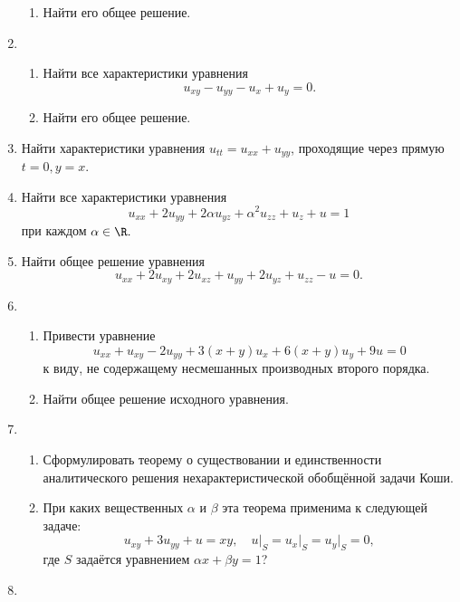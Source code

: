 \documentclass[a4paper]{article}
\def\a{\alpha}
\def\b{\beta}
\begin{document}
\begin{enumerate}
\begin{enumerate}
  \item
  Найти его общее решение.

\end{enumerate}

\item
\begin{enumerate}

  \item
  Найти все характеристики уравнения
  $$u_{xy}-u_{yy}-u_{x}+u_y =0.$$

  \item
  Найти его общее решение.

\end{enumerate}

\item
Найти характеристики уравнения $u_{tt}=u_{xx}+u_{yy}$, проходящие через
прямую $t=0, y=x$.

\item
Найти все характеристики уравнения
$$u_{xx}+2u_{yy}+2\a u_{yz}+\a^2 u_{zz} +u_z+ u=1$$
при каждом $\a\in\R.$

\item
Найти общее решение уравнения
$$u_{xx}+2u_{xy}+2 u_{xz}+u_{yy} +2u_{yz} +u_{zz} - u=0.$$

\item
\begin{enumerate}

\item
Привести уравнение
$$u_{xx}+u_{xy}-2u_{yy}+3(x+y)u_x+6(x+y)u_y+9u=0$$
к виду, не содержащему несмешанных производных второго порядка.

\item
Найти общее решение исходного уравнения.
\end{enumerate}

\item
\begin{enumerate}

\item
Сформулировать теорему о существовании и един\-ствен\-нос\-ти аналитического
решения не\-ха\-рак\-те\-рис\-ти\-чес\-кой об\-об\-щ\"ен\-ной за\-да\-чи Коши.

\item
При каких вещественных $\a$ и $\b$ эта теорема применима к следующей задаче:
$$u_{xy}+3u_{yy}+u=xy,\quad u\Big|_S=u_x\Big|_S=u_y\Big|_S=0,$$
где $S$ задаётся уравнением $\a x+\b y=1$?
\end{enumerate}

\item
\begin{enumerate}


\end{enumerate}
\end{enumerate}
\end{document}
